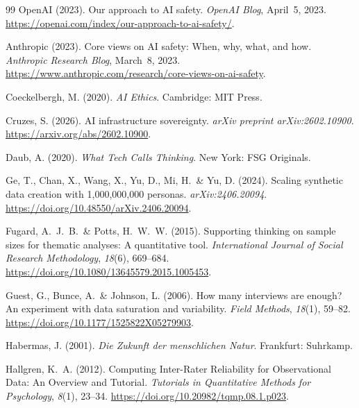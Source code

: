 \documentclass[12pt,a4paper]{article}
\begin{document}
\begin{thebibliography}{99}
  OpenAI (2023).
  Our approach to AI safety.
  \textit{OpenAI Blog}, April~5, 2023.
  \url{https://openai.com/index/our-approach-to-ai-safety/}.

  Anthropic (2023).
  Core views on AI safety: When, why, what, and how.
  \textit{Anthropic Research Blog}, March~8, 2023.
  \url{https://www.anthropic.com/research/core-views-on-ai-safety}.

  Coeckelbergh, M. (2020).
  \textit{AI Ethics}.
  Cambridge: MIT Press.

  Cruzes, S. (2026).
  AI infrastructure sovereignty.
  \textit{arXiv preprint arXiv:2602.10900}.
  \url{https://arxiv.org/abs/2602.10900}.

  Daub, A. (2020).
  \textit{What Tech Calls Thinking}.
  New York: FSG Originals.

  Ge, T., Chan, X., Wang, X., Yu, D., Mi, H.~\& Yu, D. (2024).
  Scaling synthetic data creation with 1{,}000{,}000{,}000 personas.
  \textit{arXiv:2406.20094}.
  \url{https://doi.org/10.48550/arXiv.2406.20094}.


  Fugard, A.~J.~B.~\& Potts, H.~W.~W. (2015).
  Supporting thinking on sample sizes for thematic analyses: A quantitative tool.
  \textit{International Journal of Social Research Methodology}, \textit{18}(6), 669--684.
  \url{https://doi.org/10.1080/13645579.2015.1005453}.

  Guest, G., Bunce, A.~\& Johnson, L. (2006).
  How many interviews are enough? An experiment with data saturation and variability.
  \textit{Field Methods}, \textit{18}(1), 59--82.
  \url{https://doi.org/10.1177/1525822X05279903}.

  Habermas, J. (2001).
  \textit{Die Zukunft der menschlichen Natur}.
  Frankfurt: Suhrkamp.

  Hallgren, K.~A. (2012).
  Computing Inter-Rater Reliability for Observational Data: An Overview and Tutorial.
  \textit{Tutorials in Quantitative Methods for Psychology}, \textit{8}(1), 23--34.
  \url{https://doi.org/10.20982/tqmp.08.1.p023}.


\end{thebibliography}
\end{document}
